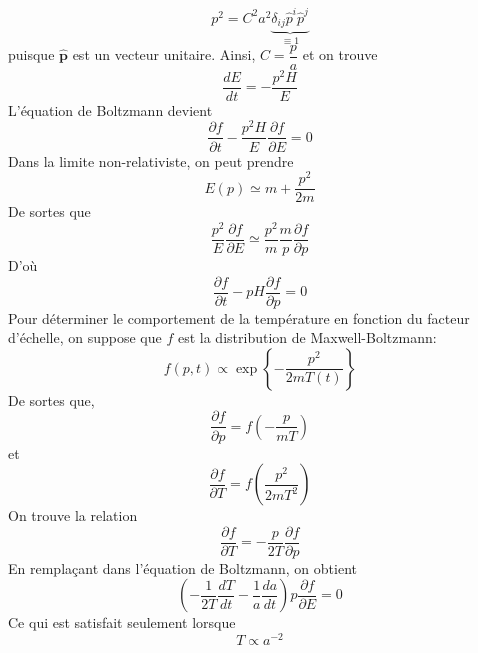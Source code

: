 \documentclass{article}
\numberwithin{equation}{section}
\newcommand{\hatp}{\hat{p}}
\begin{document}
\[
        p^2 = C^2 a^2 \underbrace{\delta_{ij}\hatp^{i}\hatp^{j}}_{\equiv 1}
\]
puisque $\mathbf{\hatp}$ est un vecteur unitaire. Ainsi, $C = \dfrac{p}{a}$ et on trouve
\[
        \frac{d E}{d t} = -\frac{p^2H}{E} 
\]
L'équation de Boltzmann devient
\[
        \frac{\partial f}{\partial t} - \frac{p^2H}{E}\frac{\partial f}{\partial E} = 0
\]
Dans la limite non-relativiste, on peut prendre 
\[
        E(p) \simeq m + \frac{p^2}{2m}
\]
De sortes que 
\[
        \frac{p^2}{E} \frac{\partial f}{\partial E} \simeq \frac{p^2}{m} \frac{m}{p} \frac{\partial f}{\partial p}
\]
D'où
\[
        \frac{\partial f}{\partial t} - pH \frac{\partial f}{\partial p} = 0
\]
Pour déterminer le comportement de la température en fonction du facteur d'échelle, on 
suppose que $f$ est la distribution de Maxwell-Boltzmann:
\[
        f(p, t) \propto 
                \exp \left\{ -\frac{p^2}{2mT(t)} \right\}
\]
De sortes que,
\[
        \frac{\partial f}{\partial p} = f \left(-\frac{p}{mT}  \right)
\]
et
\[
        \frac{\partial f}{\partial T} = f \left( \frac{p^2}{2mT^2} \right)
\]
On trouve la relation
\[
        \frac{\partial f}{\partial T} = -\frac{p}{2T} \frac{\partial f}{\partial p}
\]
En remplaçant dans l'équation de Boltzmann, on obtient
\[
        \left( -\frac{1}{2T}\frac{d T}{d t} - \frac{1}{a}\frac{d a}{d t}   \right) p\frac{\partial f}{\partial E} = 0
\]
Ce qui est satisfait seulement lorsque
\[
        T \propto a^{-2}
\]

\end{document}
